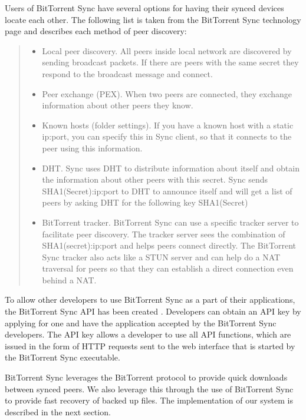 \documentclass[12pt]{report}
\begin{document}
Users of BitTorrent Sync have several options for having their synced devices locate each other. The following list is taken from the BitTorrent Sync technology page \cite{btsynctech} and describes each method of peer discovery:

\begin{quote}
\begin{itemize}
\item Local peer discovery. All peers inside local network are discovered by sending broadcast packets. If there are peers with the same secret they respond to the broadcast message and connect.
\item Peer exchange (PEX). When two peers are connected, they exchange information about other peers they know.
\item Known hosts (folder settings). If you have a known host with a static ip:port, you can specify this in Sync client, so that it connects to the peer using this information.
\item DHT. Sync uses DHT to distribute information about itself and obtain the information about other peers with this secret. Sync sends SHA1(Secret):ip:port to DHT to announce itself and will get a list of peers by asking DHT for the following key SHA1(Secret)
\item BitTorrent tracker. BitTorrent Sync can use a specific tracker server to facilitate peer discovery. The tracker server sees the combination of SHA1(secret):ip:port and helps peers connect directly. The BitTorrent Sync tracker also acts like a STUN server and can help do a NAT traversal for peers so that they can establish a direct connection even behind a NAT.
\end{itemize}
\end{quote}

To allow other developers to use BitTorrent Sync as a part of their applications, the BitTorrent Sync API has been created \cite{btsyncapi}. Developers can obtain an API key by applying for one and have the application accepted by the BitTorrent Sync developers. The API key allows a developer to use all API functions, which are issued in the form of HTTP requests sent to the web interface that is started by the BitTorrent Sync executable.

BitTorrent Sync leverages the BitTorrent protocol to provide quick downloads between synced peers. We also leverage this through the use of BitTorrent Sync to provide fast recovery of backed up files. The implementation of our system is described in the next section.
\end{document}
